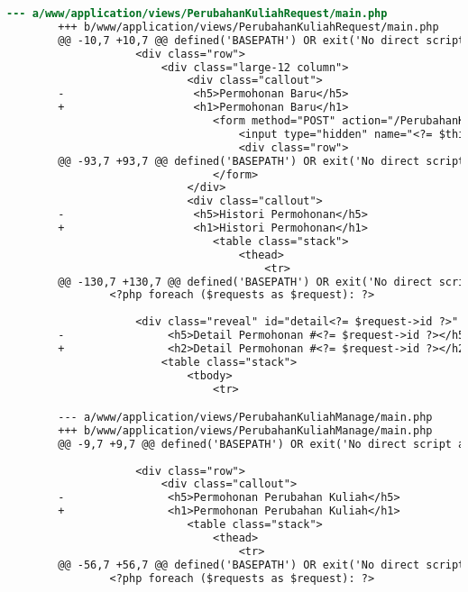 \begin{itemize}
\begin{lstlisting}[frame=single, label={lst:perbaikan_1.3.1_tag_heading}, language=diff, caption=Perbaikan Kriteria Sukses 1.3.1 - Penggunaan \textit{Heading} Tidak Tepat]
        --- a/www/application/views/PerubahanKuliahRequest/main.php
        +++ b/www/application/views/PerubahanKuliahRequest/main.php
        @@ -10,7 +10,7 @@ defined('BASEPATH') OR exit('No direct script access allowed');
                    <div class="row">
                        <div class="large-12 column">
                            <div class="callout">
        -                    <h5>Permohonan Baru</h5>
        +                    <h1>Permohonan Baru</h1>
                                <form method="POST" action="/PerubahanKuliahRequest/add">
                                    <input type="hidden" name="<?= $this->security->get_csrf_token_name() ?>" value="<?= $this->security->get_csrf_hash() ?>" />
                                    <div class="row">
        @@ -93,7 +93,7 @@ defined('BASEPATH') OR exit('No direct script access allowed');
                                </form>
                            </div>
                            <div class="callout">
        -                    <h5>Histori Permohonan</h5>
        +                    <h1>Histori Permohonan</h1>
                                <table class="stack">
                                    <thead>
                                        <tr>
        @@ -130,7 +130,7 @@ defined('BASEPATH') OR exit('No direct script access allowed');
                <?php foreach ($requests as $request): ?>
        
                    <div class="reveal" id="detail<?= $request->id ?>" data-reveal>
        -                <h5>Detail Permohonan #<?= $request->id ?></h5>
        +                <h2>Detail Permohonan #<?= $request->id ?></h2>
                        <table class="stack">
                            <tbody>
                                <tr>

        --- a/www/application/views/PerubahanKuliahManage/main.php
        +++ b/www/application/views/PerubahanKuliahManage/main.php
        @@ -9,7 +9,7 @@ defined('BASEPATH') OR exit('No direct script access allowed');
            
                    <div class="row">
                        <div class="callout">
        -                <h5>Permohonan Perubahan Kuliah</h5>
        +                <h1>Permohonan Perubahan Kuliah</h1>
                            <table class="stack">
                                <thead>
                                    <tr>
        @@ -56,7 +56,7 @@ defined('BASEPATH') OR exit('No direct script access allowed');
                <?php foreach ($requests as $request): ?>


\end{lstlisting}
\end{itemize}
